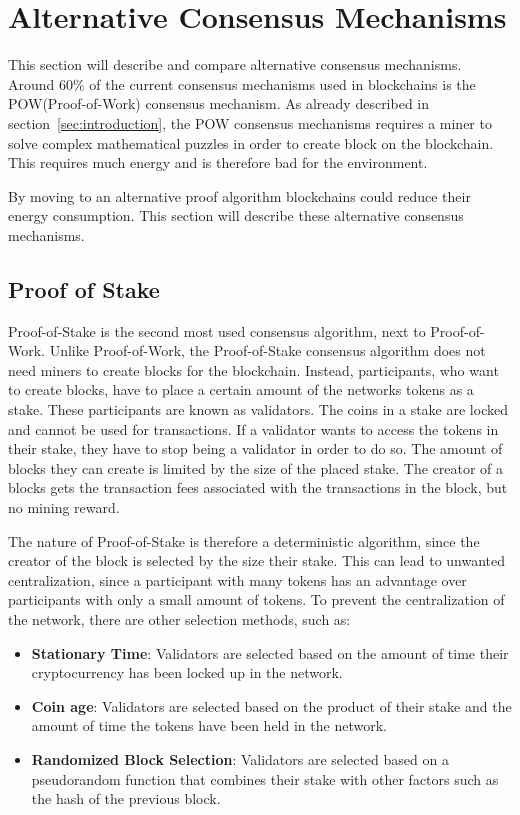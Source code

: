 

\section{Alternative Consensus Mechanisms}\label{sec:alternative-consensus-mechanisms}
This section will describe and compare alternative consensus mechanisms.
Around 60\% of the current consensus mechanisms used in blockchains is the POW(Proof-of-Work) consensus mechanism.
As already described in section\ \ref{sec:introduction}, the POW consensus mechanisms requires a miner to solve complex mathematical puzzles in order to create block on the blockchain.
This requires much energy and is therefore bad for the environment.\cite{overview-of-sustainablity-blockchains,moralis-pow-enery-consumption}

By moving to an alternative proof algorithm blockchains could reduce their energy consumption.
This section will describe these alternative consensus mechanisms.\cite{4-ways-to-counter-blockchains-energy-consumption}

\subsection{Proof of Stake}\label{subsec:proof-of-stake}
Proof-of-Stake is the second most used consensus algorithm, next to Proof-of-Work.
Unlike Proof-of-Work, the Proof-of-Stake consensus algorithm does not need miners to create blocks for the blockchain.
Instead, participants, who want to create blocks, have to place a certain amount of the networks tokens as a stake.
These participants are known as validators.
The coins in a stake are locked and cannot be used for transactions.
If a validator wants to access the tokens in their stake, they have to stop being a validator in order to do so.
The amount of blocks they can create is limited by the size of the placed stake.
The creator of a blocks gets the transaction fees associated with the transactions in the block, but no mining reward.\cite{bitpanda-pos}

The nature of Proof-of-Stake is therefore a deterministic algorithm, since the creator of the block is selected by the size their stake.
This can lead to unwanted centralization, since a participant with many tokens has an advantage over participants with only a small amount of tokens.
To prevent the centralization of the network, there are other selection methods, such as:

\begin{itemize}
    \item\textbf{Stationary Time}: Validators are selected based on the amount of time their cryptocurrency has been locked up in the network.\cite{bitpanda-pos}
    \item\textbf{Coin age}: Validators are selected based on the product of their stake and the amount of time the tokens have been held in the network.\cite{bitflyer-glossary}
    \item\textbf{Randomized Block Selection}: Validators are selected based on a pseudorandom function that combines their stake with other factors such as the hash of the previous block.\cite{cryptonews-pos}
\end{itemize}

